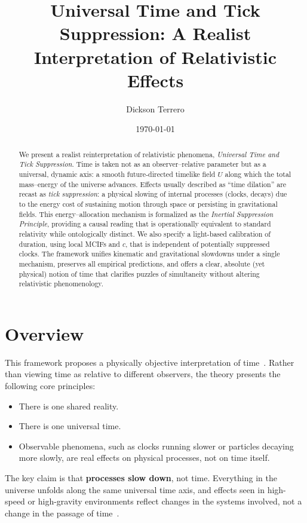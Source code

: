 \documentclass[12pt]{article}
\title{Universal Time and Tick Suppression: A Realist Interpretation of Relativistic Effects}
\author{Dickson Terrero}
\date{\today}
\theoremstyle{plain} %
\begin{document}
\maketitle
\begin{abstract}
We present a realist reinterpretation of relativistic phenomena, \emph{Universal Time and Tick Suppression}. Time is taken not as an observer–relative parameter but as a universal, dynamic axis: a smooth future-directed timelike field \(U\) along which the total mass–energy of the universe advances. Effects usually described as “time dilation” are recast as \emph{tick suppression}: a physical slowing of internal processes (clocks, decays) due to the energy cost of sustaining motion through space or persisting in gravitational fields. This energy–allocation mechanism is formalized as the \emph{Inertial Suppression Principle}, providing a causal reading that is operationally equivalent to standard relativity while ontologically distinct. We also specify a light-based calibration of duration, using local MCIFs and \(c\), that is independent of potentially suppressed clocks. The framework unifies kinematic and gravitational slowdowns under a single mechanism, preserves all empirical predictions, and offers a clear, absolute (yet physical) notion of time that clarifies puzzles of simultaneity without altering relativistic phenomenology.
\end{abstract}

\section*{Overview}

This framework proposes a physically objective interpretation of time~\cite{Einstein1905}. Rather than viewing time as relative to different observers, the theory presents the following core principles:

\begin{itemize}
  \item There is one shared reality.
  \item There is one universal time.
  \item Observable phenomena, such as clocks running slower or particles decaying more slowly, are real effects on physical processes, not on time itself.
\end{itemize}

\noindent The key claim is that \textbf{processes slow down}, not time. Everything in the universe unfolds along the same universal time axis, and effects seen in high-speed or high-gravity environments reflect changes in the systems involved, not a change in the passage of time~\cite{Rindler2006, Carroll2004}.
\end{document}
